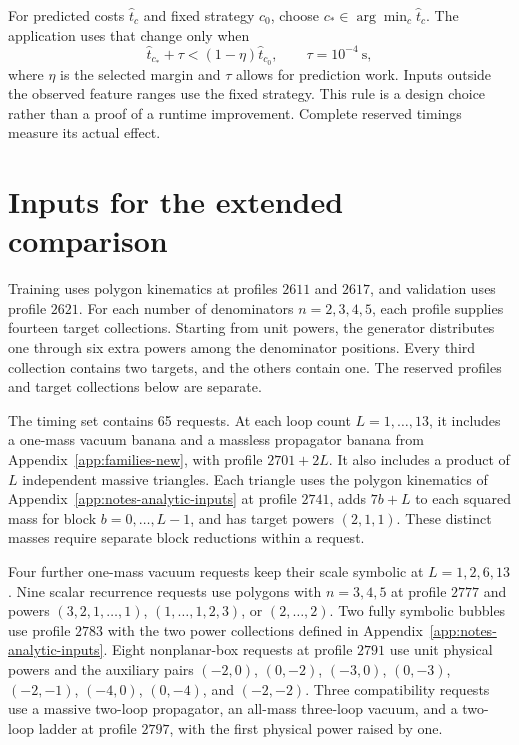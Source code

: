 For predicted costs $\widehat t_c$ and fixed strategy $c_0$, choose $c_*\in\arg\min_c\widehat t_c$. The application uses that change only when
\begin{equation}
 \widehat t_{c_*}+\tau < (1-\eta)\widehat t_{c_0},
 \qquad \tau=10^{-4}\ \mathrm{s},
 \label{eq:notes-fast-margin}
\end{equation}
where $\eta$ is the selected margin and $\tau$ allows for prediction work. Inputs outside the observed feature ranges use the fixed strategy. This rule is a design choice rather than a proof of a runtime improvement. Complete reserved timings measure its actual effect.

\section{Inputs for the extended comparison}
\label{app:notes-fast-inputs}
Training uses polygon kinematics at profiles $2611$ and $2617$, and validation uses profile $2621$. For each number of denominators $n=2,3,4,5$, each profile supplies fourteen target collections. Starting from unit powers, the generator distributes one through six extra powers among the denominator positions. Every third collection contains two targets, and the others contain one. The reserved profiles and target collections below are separate.

The timing set contains 65 requests. At each loop count $L=1,\ldots,13$, it includes a one-mass vacuum banana and a massless propagator banana from Appendix~\ref{app:families-new}, with profile $2701+2L$. It also includes a product of $L$ independent massive triangles. Each triangle uses the polygon kinematics of Appendix~\ref{app:notes-analytic-inputs} at profile $2741$, adds $7b+L$ to each squared mass for block $b=0,\ldots,L-1$, and has target powers $(2,1,1)$. These distinct masses require separate block reductions within a request.

Four further one-mass vacuum requests keep their scale symbolic at $L=1,2,6,13$. Nine scalar recurrence requests use polygons with $n=3,4,5$ at profile $2777$ and powers $(3,2,1,\ldots,1)$, $(1,\ldots,1,2,3)$, or $(2,\ldots,2)$. Two fully symbolic bubbles use profile $2783$ with the two power collections defined in Appendix~\ref{app:notes-analytic-inputs}. Eight nonplanar-box requests at profile $2791$ use unit physical powers and the auxiliary pairs $(-2,0)$, $(0,-2)$, $(-3,0)$, $(0,-3)$, $(-2,-1)$, $(-4,0)$, $(0,-4)$, and $(-2,-2)$. Three compatibility requests use a massive two-loop propagator, an all-mass three-loop vacuum, and a two-loop ladder at profile $2797$, with the first physical power raised by one.

